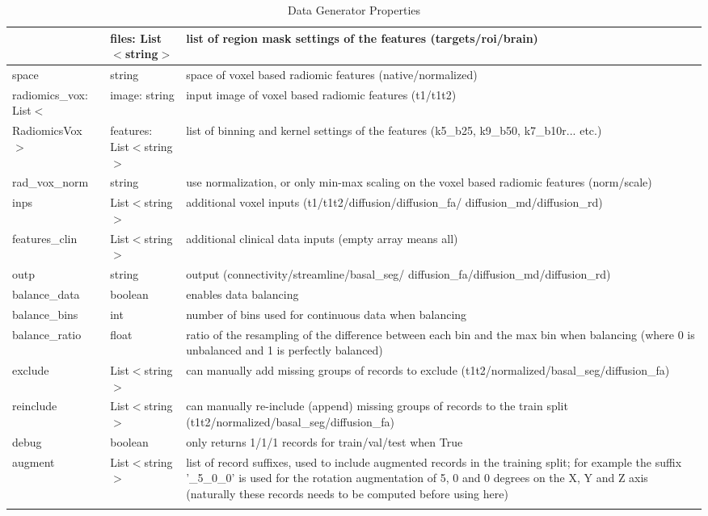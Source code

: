 \begin{longtable}[H]{|L{3cm}|L{3cm}|L{10cm}|}
 & files: List$<$string$>$ & list of region mask settings of the features \newline (targets/roi/brain) \\ \hline
space & string & space of voxel based radiomic features \newline (native/normalized) \\ \hline
radiomics\_vox: List$<$ & image: string & input image of voxel based radiomic features \newline (t1/t1t2) \\ 
{   }RadiomicsVox \newline$>$ & features: List$<$string$>$ & list of binning and kernel settings of the features \newline (k5\_b25, k9\_b50, k7\_b10r... etc.) \\ \hline
rad\_vox\_norm & string & use normalization, or only min-max scaling on the voxel based radiomic features (norm/scale) \\ \hline
inps & List$<$string$>$ & additional voxel inputs (t1/t1t2/diffusion/diffusion\_fa/ diffusion\_md/diffusion\_rd) \\ \hline
features\_clin & List$<$string$>$ & additional clinical data inputs (empty array means all) \\ \hline
outp & string & output (connectivity/streamline/basal\_seg/ diffusion\_fa/diffusion\_md/diffusion\_rd) \\ \hline
balance\_data & boolean & enables data balancing \\ \hline
balance\_bins & int & number of bins used for continuous data when balancing \\ \hline
balance\_ratio & float & ratio of the resampling of the difference between each bin and the max bin when balancing (where 0 is unbalanced and 1 is perfectly balanced) \\ \hline
exclude & List$<$string$>$ & can manually add missing groups of records to exclude (t1t2/normalized/basal\_seg/diffusion\_fa) \\ \hline
reinclude & List$<$string$>$ & can manually re-include (append) missing groups of records to the train split (t1t2/normalized/basal\_seg/diffusion\_fa) \\ \hline
debug & boolean & only returns 1/1/1 records for train/val/test when True \\ \hline
augment & List$<$string$>$ & list of record suffixes, used to include augmented records in the training split; for example the suffix '\_5\_0\_0' is used for the rotation augmentation of 5, 0 and 0 degrees on the X, Y and Z axis (naturally these records needs to be computed before using here) \\ \hline
\caption{Data Generator Properties}
\end{longtable}







